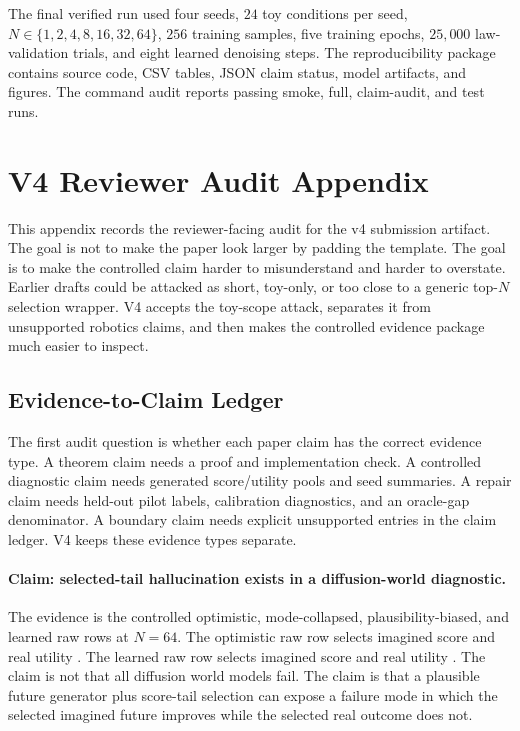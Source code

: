 \documentclass{article}
\begin{document}
The final verified run used four seeds, $24$ toy conditions per seed, $N\in\{1,2,4,8,16,32,64\}$, $256$ training samples, five training epochs, $25{,}000$ law-validation trials, and eight learned denoising steps. The reproducibility package contains source code, CSV tables, JSON claim status, model artifacts, and figures. The command audit reports passing smoke, full, claim-audit, and test runs.

\section{V4 Reviewer Audit Appendix}
\label{app:v4-reviewer-audit}

This appendix records the reviewer-facing audit for the v4 submission artifact.
The goal is not to make the paper look larger by padding
the template. The goal is to make the controlled claim harder to misunderstand
and harder to overstate. Earlier drafts could be attacked as short, toy-only,
or too close to a generic top-$N$ selection wrapper. V4 accepts the toy-scope
attack, separates it from unsupported robotics claims, and then makes the
controlled evidence package much easier to inspect.

\subsection{Evidence-to-Claim Ledger}
\label{app:v4-evidence-claim-ledger}

The first audit question is whether each paper claim has the correct evidence
type. A theorem claim needs a proof and implementation check. A controlled
diagnostic claim needs generated score/utility pools and seed summaries. A
repair claim needs held-out pilot labels, calibration diagnostics, and an
oracle-gap denominator. A boundary claim needs explicit unsupported entries in
the claim ledger. V4 keeps these evidence types separate.

\paragraph{Claim: selected-tail hallucination exists in a diffusion-world
diagnostic.}
The evidence is the controlled optimistic, mode-collapsed, plausibility-biased,
and learned raw rows at $N=64$. The optimistic raw row selects imagined score
\VFourDWMOptimisticImagined{} and real utility \VFourDWMOptimisticReal{}.
The learned raw row selects imagined score \VFourDWMLearnedRawImagined{} and
real utility \VFourDWMLearnedRawReal{}. The claim is not that all diffusion
world models fail. The claim is that a plausible future generator plus
score-tail selection can expose a failure mode in which the selected imagined
future improves while the selected real outcome does not.
\end{document}
